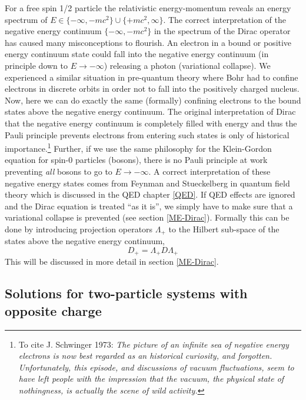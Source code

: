 \documentclass[12pt]{article}
\begin{document}
For a free spin 1/2 particle the relativistic energy-momentum reveals an energy spectrum of $E\in\{-\infty,-mc^2\}\cup\{+mc^2,\infty\}$. The correct interpretation of the negative energy continuum $\{-\infty,-mc^2\}$ in the spectrum of the Dirac operator has caused many misconceptions to flourish. An electron in a bound or positive energy continuum state could fall into the negative energy continuum (in principle down to $E\rightarrow -\infty$) releasing a photon (variational collapse). We experienced a similar situation in pre-quantum theory where Bohr had to confine electrons in discrete orbits in order not to fall into the positively charged nucleus. Now, here we can do exactly the same (formally) confining electrons to the bound states above the negative energy continuum. The original interpretation of Dirac that the negative energy continuum is completely filled with energy and thus the Pauli principle prevents electrons from entering such states is only of historical importance.\footnote{To cite J. Schwinger 1973: \it The picture of an infinite sea of negative energy electrons is now best regarded as an historical curiosity, and forgotten. Unfortunately, this episode, and discussions of vacuum fluctuations, seem to have left people with the impression that the vacuum, the physical state of nothingness, is actually the scene of wild activity.} Further, if we use the same philosophy for the Klein-Gordon equation for spin-0 particles (bosons), there is no Pauli principle at work preventing {\it all} bosons to go to $E\rightarrow -\infty$. A correct interpretation of these negative energy states comes from Feynman and Stueckelberg in quantum field theory which is discussed in the QED chapter \ref{QED}. If QED effects are ignored and the Dirac equation is treated ``as it is'', we simply have to make sure that a variational collapse is prevented (see section \ref{ME-Dirac}). Formally this can be done by introducing projection operators $\Lambda_{+}$ to the Hilbert sub-space of the states above the negative energy continuum,
\begin{equation}
   D_{+} = \Lambda_{+} D \Lambda_{+}
   \label{DiracBS}
\end{equation}
This will be discussed in more detail in section \ref{ME-Dirac}.

\subsection{\sffamily Solutions for two-particle systems with opposite charge}
\end{document}
